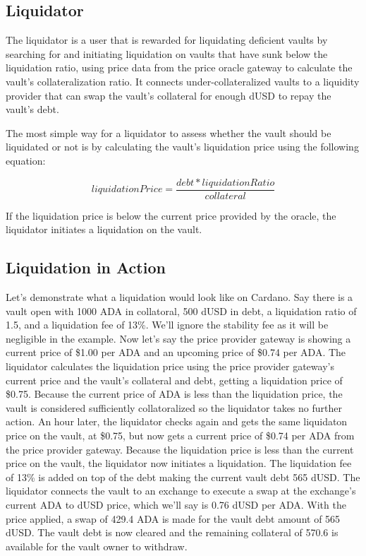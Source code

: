 \documentclass[12pt]{article}
\begin{document}
\subsection{Liquidator}

The liquidator is a user that is rewarded for liquidating deficient vaults by searching for and initiating liquidation on vaults that have sunk below the liquidation ratio, using price data from the price oracle gateway to calculate the vault's collateralization ratio. It connects under-collateralized vaults to a liquidity provider that can swap the vault's collateral for enough dUSD to repay the vault's debt.

The most simple way for a liquidator to assess whether the vault should be liquidated or not is by calculating the vault's liquidation price using the following equation:

\begin{equation*}
	liquidationPrice = \frac{debt * liquidationRatio}{collateral}
\end{equation*}

If the liquidation price is below the current price provided by the oracle, the liquidator initiates a liquidation on the vault.

\subsection{Liquidation in Action}

Let's demonstrate what a liquidation would look like on Cardano. Say there is a vault open with 1000 ADA in collatoral, 500 dUSD in debt, a liquidation ratio of 1.5, and a liquidation fee of 13\%. We'll ignore the stability fee as it will be negligible in the example. Now let's say the price provider gateway is showing a current price of \$1.00 per ADA and an upcoming price of \$0.74 per ADA. The liquidator calculates the liquidation price using the price provider gateway's current price and the vault's collateral and debt, getting a liquidation price of \$0.75. Because the current price of ADA is less than the liquidation price, the vault is considered sufficiently collatoralized so the liquidator takes no further action. An hour later, the liquidator checks again and gets the same liquidaton price on the vault, at \$0.75, but now gets a current price of \$0.74 per ADA from the price provider gateway. Because the liquidation price is less than the current price on the vault, the liquidator now initiates a liquidation. The liquidation fee of 13\% is added on top of the debt making the current vault debt 565 dUSD. The liquidator connects the vault to an exchange to execute a swap at the exchange's current ADA to dUSD price, which we'll say is 0.76 dUSD per ADA. With the price applied, a swap of 429.4 ADA is made for the vault debt amount of 565 dUSD. The vault debt is now cleared and the remaining collateral of 570.6 is available for the vault owner to withdraw.
\end{document}
